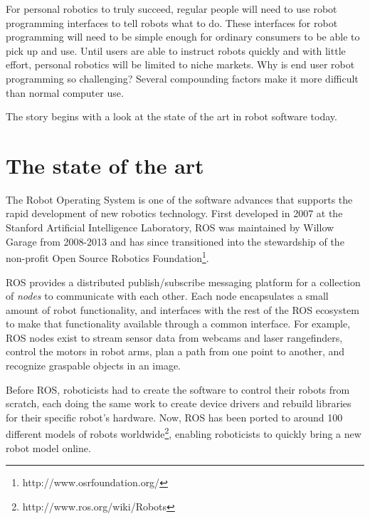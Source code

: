 \documentclass[10pt,twocolumn]{article}
\begin{document}
For personal robotics to truly succeed, regular people will need to use robot programming interfaces to tell robots what to do. These interfaces for robot programming will need to be simple enough for ordinary consumers to be able to pick up and use. Until users are able to instruct robots quickly and with little effort, personal robotics will be limited to niche markets. Why is end user robot programming so challenging? Several compounding factors make it more difficult than normal computer use.

The story begins with a look at the state of the art in robot software today.


\section{The state of the art}


The Robot Operating System\cite{ros} is one of the software advances that supports the rapid development of new robotics technology.  First developed in 2007 at the Stanford Artificial Intelligence Laboratory, ROS was maintained by Willow Garage from 2008-2013 and has since transitioned into the stewardship of the non-profit Open Source Robotics Foundation\footnote{http://www.osrfoundation.org/}.

ROS provides a distributed publish/subscribe messaging platform for a collection of {\em nodes} to communicate with each other. Each node encapsulates a small amount of robot functionality, and interfaces with the rest of the ROS ecosystem to make that functionality available through a common interface. For example, ROS nodes exist to stream sensor data from webcams and laser rangefinders, control the motors in robot arms, plan a path from one point to another, and recognize graspable objects in an image.

Before ROS, roboticists had to create the software to control their robots from scratch, each doing the same work to create device drivers and rebuild libraries for their specific robot's hardware.  Now, ROS has been ported to around 100 different models of robots worldwide\footnote{http://www.ros.org/wiki/Robots}, enabling roboticists to quickly bring a new robot model online.
\end{document}
